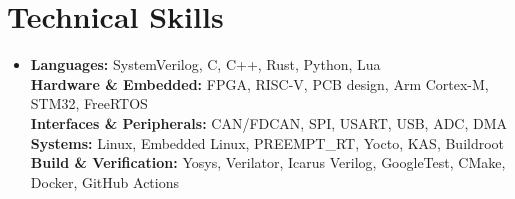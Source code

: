 \documentclass[letterpaper,11pt]{article}
\begin{document}
\section{Technical Skills}
\begin{itemize}[leftmargin=0.15in, label={}]
\small\linespread{0.9}\selectfont\item{
\textbf{Languages:} SystemVerilog, C, C++, Rust, Python, Lua \\
\textbf{Hardware \& Embedded:} FPGA, RISC-V, PCB design, Arm Cortex-M, STM32, FreeRTOS \\
\textbf{Interfaces \& Peripherals:} CAN/FDCAN, SPI, USART, USB, ADC, DMA \\
\textbf{Systems:} Linux, Embedded Linux, PREEMPT\_RT, Yocto, KAS, Buildroot \\
\textbf{Build \& Verification:} Yosys, Verilator, Icarus Verilog, GoogleTest, CMake, Docker, GitHub Actions
}
\end{itemize}

\end{document}
